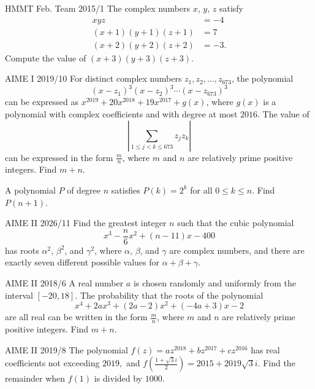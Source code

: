 \documentclass[11pt]{scrartcl}
\begin{document}
\begin{problem}[12]{HMMT Feb. Team 2015/1}
The complex numbers $x$, $y$, $z$ satisfy
\begin{align*}
xyz &= -4 \\
(x+1)(y+1)(z+1) &= 7 \\
(x+2)(y+2)(z+2) &= -3.
\end{align*}
Compute the value of $(x+3)(y+3)(z+3)$.
\end{problem}

\begin{problem}[13]{AIME I 2019/10}
For distinct complex numbers $z_1,z_2,\dots,z_{673}$, the polynomial \[ (x-z_1)^3(x-z_2)^3 \cdots (x-z_{673})^3 \]can be expressed as $x^{2019} + 20x^{2018} + 19x^{2017}+g(x)$, where $g(x)$ is a polynomial with complex coefficients and with degree at most $2016$. The value of \[ \left| \sum_{1 \le j <k \le 673} z_jz_k \right| \]can be expressed in the form $\tfrac{m}{n}$, where $m$ and $n$ are relatively prime positive integers. Find $m+n$.
\end{problem}

\begin{problem}[14]{}
A polynomial $P$ of degree $n$ satisfies $P(k) = 2^k$ for all $0 \le k \le n$. Find $P(n+1)$.
\end{problem}

\begin{problem}[15]{AIME II 2026/11}
Find the greatest integer $n$ such that the cubic polynomial\[x^{3} -\frac{n}{6}x^{2} + (n - 11)x - 400\] has roots $\alpha^2$, $\beta^2$, and $\gamma^2$, where $\alpha$, $\beta$, and $\gamma$ are complex numbers, and there are exactly seven different possible values for $\alpha + \beta + \gamma$.
\end{problem}

\begin{problem}[16]{AIME II 2018/6}
A real number $a$ is chosen randomly and uniformly from the interval $[-20, 18]$. The probability that the roots of the polynomial \[x^4 + 2ax^3 + (2a - 2)x^2 + (-4a + 3)x - 2\] are all real can be written in the form $\tfrac{m}{n}$, where $m$ and $n$ are relatively prime positive integers. Find $m + n$.
\end{problem}

\begin{problem}[17]{AIME II 2019/8}
The polynomial $f(z)=az^{2018}+bz^{2017}+cz^{2016}$ has real coefficients not exceeding $2019,$ and $f\left(\tfrac{1+\sqrt3i}{2}\right)=2015+2019\sqrt3i$. Find the remainder when $f(1)$ is divided by $1000$.
\end{problem}
\end{document}
